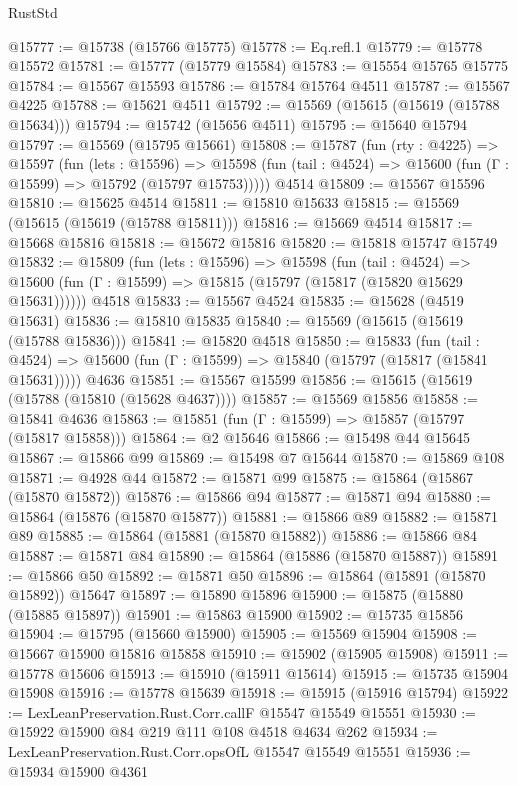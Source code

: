 \begin{lexlean}{RustStd}
\begin{coremodule}
{\begin{coremodule}
{{{{{{{{{{{{{{{{{{{{{{{{{{{{{{{{{{{{{{{{{{{{{{{{{{{{{{{{{{{{@15777 := @15738 (@15766 @15775)
@15778 := Eq.refl.{1}
@15779 := @15778 @15572
@15781 := @15777 (@15779 @15584)
@15783 := @15554 @15765 @15775
@15784 := @15567 @15593
@15786 := @15784 @15764 @4511
@15787 := @15567 @4225
@15788 := @15621 @4511
@15792 := @15569 (@15615 (@15619 (@15788 @15634)))
@15794 := @15742 (@15656 @4511)
@15795 := @15640 @15794
@15797 := @15569 (@15795 @15661)
@15808 := @15787
    (fun (rty : @4225) =>
    @15597
      (fun (lets : @15596) =>
      @15598 (fun (tail : @4524) => @15600 (fun (Γ : @15599) => @15792 (@15797 @15753)))))
    @4514
@15809 := @15567 @15596
@15810 := @15625 @4514
@15811 := @15810 @15633
@15815 := @15569 (@15615 (@15619 (@15788 @15811)))
@15816 := @15669 @4514
@15817 := @15668 @15816
@15818 := @15672 @15816
@15820 := @15818 @15747 @15749
@15832 := @15809
    (fun (lets : @15596) =>
    @15598
      (fun (tail : @4524) =>
      @15600 (fun (Γ : @15599) => @15815 (@15797 (@15817 (@15820 @15629 @15631))))))
    @4518
@15833 := @15567 @4524
@15835 := @15628 (@4519 @15631)
@15836 := @15810 @15835
@15840 := @15569 (@15615 (@15619 (@15788 @15836)))
@15841 := @15820 @4518
@15850 := @15833
    (fun (tail : @4524) => @15600 (fun (Γ : @15599) => @15840 (@15797 (@15817 (@15841 @15631)))))
    @4636
@15851 := @15567 @15599
@15856 := @15615 (@15619 (@15788 (@15810 (@15628 @4637))))
@15857 := @15569 @15856
@15858 := @15841 @4636
@15863 := @15851 (fun (Γ : @15599) => @15857 (@15797 (@15817 @15858)))
@15864 := @2 @15646
@15866 := @15498 @44 @15645
@15867 := @15866 @99
@15869 := @15498 @7 @15644
@15870 := @15869 @108
@15871 := @4928 @44
@15872 := @15871 @99
@15875 := @15864 (@15867 (@15870 @15872))
@15876 := @15866 @94
@15877 := @15871 @94
@15880 := @15864 (@15876 (@15870 @15877))
@15881 := @15866 @89
@15882 := @15871 @89
@15885 := @15864 (@15881 (@15870 @15882))
@15886 := @15866 @84
@15887 := @15871 @84
@15890 := @15864 (@15886 (@15870 @15887))
@15891 := @15866 @50
@15892 := @15871 @50
@15896 := @15864 (@15891 (@15870 @15892)) @15647
@15897 := @15890 @15896
@15900 := @15875 (@15880 (@15885 @15897))
@15901 := @15863 @15900
@15902 := @15735 @15856
@15904 := @15795 (@15660 @15900)
@15905 := @15569 @15904
@15908 := @15667 @15900 @15816 @15858
@15910 := @15902 (@15905 @15908)
@15911 := @15778 @15606
@15913 := @15910 (@15911 @15614)
@15915 := @15735 @15904 @15908
@15916 := @15778 @15639
@15918 := @15915 (@15916 @15794)
@15922 := LexLeanPreservation.Rust.Corr.callF @15547 @15549 @15551
@15930 := @15922 @15900 @84 @219 @111 @108 @4518 @4634 @262
@15934 := LexLeanPreservation.Rust.Corr.opsOfL @15547 @15549 @15551
@15936 := @15934 @15900 @4361
}}}}}}}}}}}}}}}}}}}}}}}}}}}}}}}}}}}}}}}}}}}}}}}}}}}}}}}}}}}}
\end{coremodule}}
\end{coremodule}
\end{lexlean}
